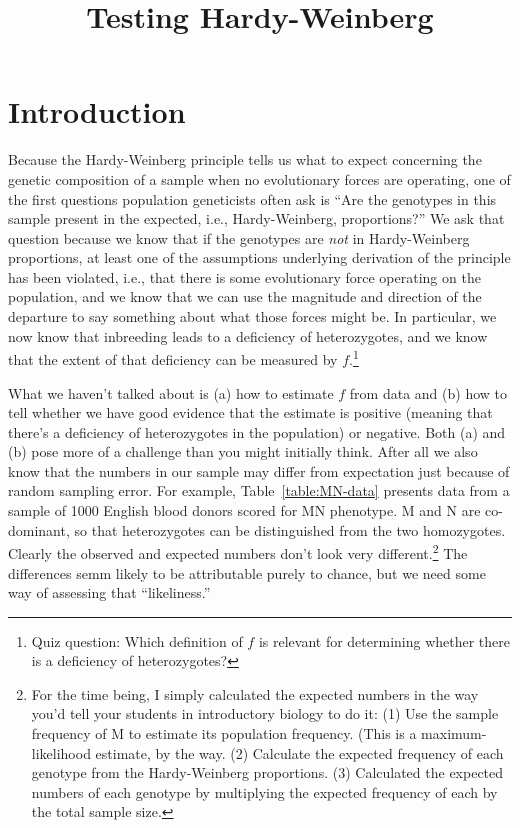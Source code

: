 \documentclass[12pt]{article}
\title{Testing Hardy-Weinberg}
\begin{document}
\maketitle

\thispagestyle{first}

\section*{Introduction}

Because the Hardy-Weinberg principle tells us what to expect
concerning the genetic composition of a sample when no evolutionary
forces are operating, one of the first questions population
geneticists often ask is ``Are the genotypes in this sample present in
the expected, i.e., Hardy-Weinberg, proportions?'' We ask that
question because we know that if the genotypes are {\it not\/} in
Hardy-Weinberg proportions, at least one of the assumptions underlying
derivation of the principle has been violated, i.e., that there is
some evolutionary force operating on the population, and we know that
we can use the magnitude and direction of the departure to say
something about what those forces might be. In particular, we now know
that inbreeding leads to a deficiency of heterozygotes, and we know
that the extent of that deficiency can be measured by
$f$.\footnote{Quiz question: Which definition of $f$ is relevant for
  determining whether there is a deficiency of heterozygotes?}

What we haven't talked about is (a) how to estimate $f$ from data and
(b) how to tell whether we have good evidence that the estimate is
positive (meaning that there's a deficiency of heterozygotes in the
population) or negative. Both (a) and (b) pose more of a challenge
than you might initially think. After all we also know that the
numbers in our sample may differ from expectation just because of
random sampling error. For example, Table~\ref{table:MN-data} presents
data from a sample of 1000 English blood donors scored for MN
phenotype. M and N are co-dominant, so that heterozygotes can be
distinguished from the two homozygotes. Clearly the observed and
expected numbers don't look very different.\footnote{For the time
  being, I simply calculated the expected numbers in the way you'd
  tell your students in introductory biology to do it: (1) Use the
  sample frequency of M to estimate its population frequency. (This is
  a maximum-likelihood estimate, by the way. (2) Calculate the
  expected frequency of each genotype from the Hardy-Weinberg
  proportions. (3) Calculated the expected numbers of each genotype by
  multiplying the expected frequency of each by the total sample
  size.} The differences semm likely to be attributable purely to
chance, but we need some way of assessing that
``likeliness.''
\end{document}

